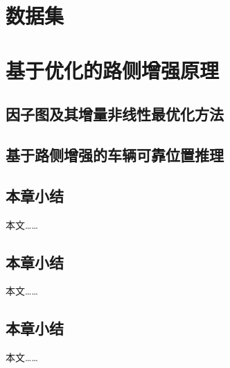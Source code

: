 \documentclass[UTF8,a4paper,12pt]{ctexart}
\numberwithin{equation}{section}
\begin{document}
\newpage
{}
\section{数据集}



\newpage
{}
\section{基于优化的路侧增强原理}

\subsection{因子图及其增量非线性最优化方法}


\subsection{基于路侧增强的车辆可靠位置推理}


\subsection{本章小结}
本文……

\subsection{本章小结}
本文……

\subsection{本章小结}
本文……



\newpage
{}
\end{document}
